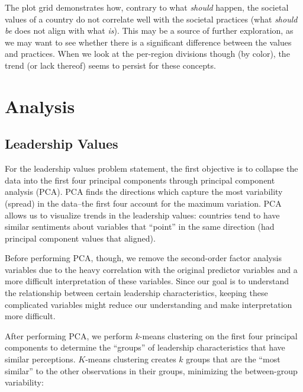 \documentclass[
]{article}
\begin{document}
The plot grid demonstrates how, contrary to what \emph{should} happen,
the societal values of a country do not correlate well with the societal
practices (what \emph{should be} does not align with what \emph{is}).
This may be a source of further exploration, as we may want to see
whether there is a significant difference between the values and
practices. When we look at the per-region divisions though (by color),
the trend (or lack thereof) seems to persist for these concepts.

\hypertarget{analysis}{%
\section{Analysis}\label{analysis}}

\hypertarget{leadership-values}{%
\subsection{Leadership Values}\label{leadership-values}}

For the leadership values problem statement, the first objective is to
collapse the data into the first four principal components through
principal component analysis (PCA). PCA finds the directions which
capture the most variability (spread) in the data--the first four
account for the maximum variation. PCA allows us to visualize trends in
the leadership values: countries tend to have similar sentiments about
variables that ``point'' in the same direction (had principal component
values that aligned).

Before performing PCA, though, we remove the second-order factor
analysis variables due to the heavy correlation with the original
predictor variables and a more difficult interpretation of these
variables. Since our goal is to understand the relationship between
certain leadership characteristics, keeping these complicated variables
might reduce our understanding and make interpretation more difficult.

After performing PCA, we perform \(k\)-means clustering on the first
four principal components to determine the ``groups'' of leadership
characteristics that have similar perceptions. \(K\)-means clustering
creates \(k\) groups that are the ``most similar'' to the other
observations in their groups, minimizing the between-group variability:

\end{document}
